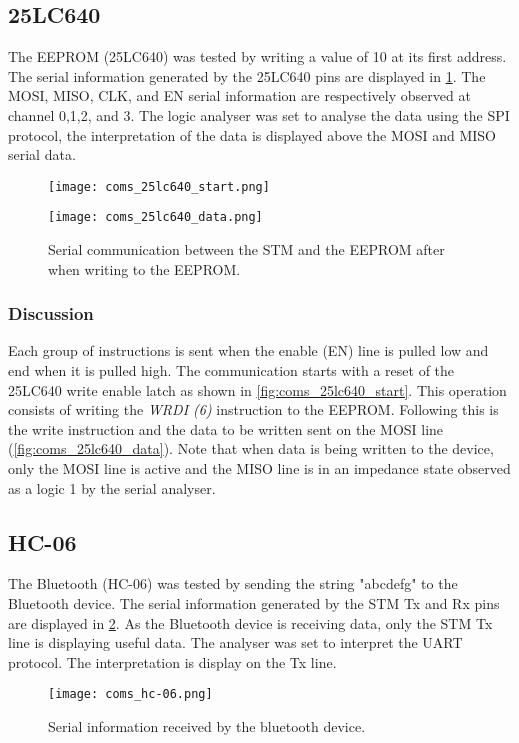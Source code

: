 \subsection{25LC640}
The EEPROM (25LC640) was tested by writing a value of 10 at its first address. The serial information generated by the 25LC640 pins are displayed in \cref{fig:coms_25lc640}. The MOSI, MISO, CLK, and EN serial information are respectively observed at channel 0,1,2, and 3. The logic analyser was set to analyse the data using the SPI protocol, the interpretation of the data is displayed above the MOSI and MISO serial data.
\begin{figure}[h!]
	\centering
	\begin{minipage}[b]{\textwidth}
		\centering
		\texttt{[image: coms\_25lc640\_start.png]}
		\label{fig:coms_25lc640_start}
	\end{minipage}
	\begin{minipage}[b]{\textwidth}
		\centering
		\texttt{[image: coms\_25lc640\_data.png]}
		\label{fig:coms_25lc640_data}
	\end{minipage}    
	\caption{Serial communication between the STM and the EEPROM after when writing to the EEPROM.}
	\label{fig:coms_25lc640}
\end{figure}
\subsubsection{Discussion}
Each group of instructions is sent when the enable (EN) line is pulled low and end when it is pulled high. The communication starts with a reset of the 25LC640 write enable latch as shown in  \cref{fig:coms_25lc640_start}. This operation consists of writing the \textit{WRDI (6)} instruction to the EEPROM. Following this is the write instruction and the data to be written sent on the MOSI line (\cref{fig:coms_25lc640_data}). Note that when data is being written to the device, only the MOSI line is active and the MISO line is in an impedance state observed as a logic 1 by the serial analyser. 

\subsection{HC-06}
The Bluetooth (HC-06) was tested by sending the string "abcdefg" to the Bluetooth device. The serial information generated by the STM Tx and Rx pins are displayed in \cref{fig:coms_hc-06}. As the Bluetooth device is receiving data, only the STM Tx line is displaying useful data. The analyser was set to interpret the UART protocol. The interpretation is display on the Tx line. 
\begin{figure}[h!]
	\centering
	\texttt{[image: coms\_hc-06.png]}
	\caption{Serial information received by the bluetooth device.}
	\label{fig:coms_hc-06}
\end{figure}

